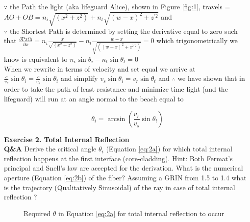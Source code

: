 \documentclass[main.tex]{subfiles}
\begin{document}
$\because$ the Path the light  (aka lifeguard Alice), shown in Figure \ref{fig:1},  travels  = $AO + OB = n_i \sqrt{(x^2 + z^2)} + n_t \sqrt{(w-x)^2 +  z^{\prime 2}}$ and\\

$\because$ the Shortest Path is determined by setting the derivative equal to zero such that $ \frac{\partial \text{Path}}{\partial x} = n_i \frac{x}{\sqrt{(x^2 + z^2)}} - n_t \frac{w-x}{\sqrt{((w-x)^2 + z^{2\prime 2})}} = 0$ which trigonometrically we know is equivalent to $n_i \sin{\theta_i} - n_t \sin{\theta_t} = 0$\\

When we rewrite in terms of velocity and set equal we arrive at $\frac{c}{v_r}\sin{\theta_i} = \frac{c}{v_s} \sin{\theta_t}$ and simplify $v_s\sin{\theta_i} = {v_r}\sin{\theta_t}$ and $\therefore$ we have shown that in order to take the path of least resistance and minimize time light (and the lifeguard) will run at an angle normal to the beach equal to 

\begin{equation}\label{sol1a}
\theta_i = \arcsin{(\frac{v_r}{v_s} \sin{\theta_t})}
\end{equation}

\textbf{Exercise 2. Total Internal Reflection}\\
\textbf{Q\&A} Derive the critical angle $\theta_i$ (Equation \ref{eq:2a}) for which total internal reflection happens at the first interface (core-cladding). Hint: Both Fermat's principal and Snell's law are accepted for the derivation. What is the numerical aperture (Equation \ref{eq:2b}) of the fiber? Assuming a GRIN from 1.5 to 1.4 what is the trajectory (Qualitatively Sinusoidal) of the ray in case of total internal reflection ? \\

\begin{figure}
\centering{}
\caption{Required $\theta$ in Equation \ref{eq:2a} for total internal reflection to occur}
\label{fig:2}
\end{figure}
\end{document}
